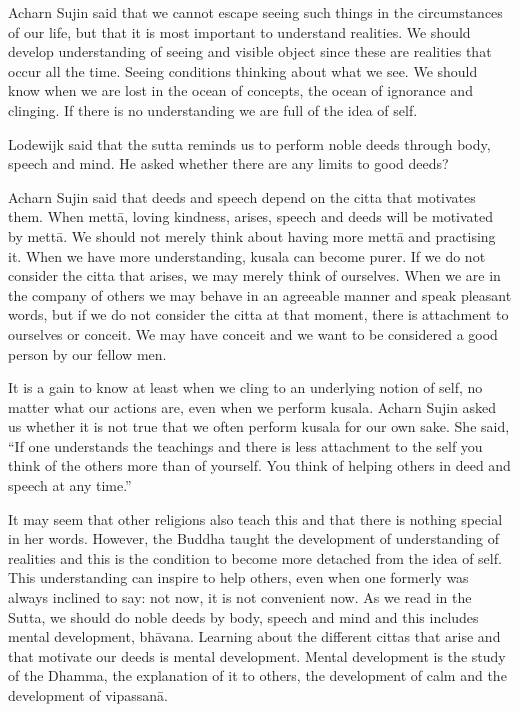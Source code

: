 Acharn Sujin said that we cannot escape seeing such things in the circumstances of our life, but that it is most important to understand realities. We should develop understanding of seeing and visible object since these are realities that occur all the time. Seeing conditions thinking about what we see. We should know when we are lost in the ocean of concepts, the ocean of ignorance and clinging. If there is no understanding we are full of the idea of self.

Lodewijk said that the sutta reminds us to perform noble deeds through body, speech and mind. He asked whether there are any limits to good deeds?

Acharn Sujin said that deeds and speech depend on the citta that motivates them. When mettā, loving kindness, arises, speech and deeds will be motivated by mettā. We should not merely think about having more mettā and practising it. When we have more understanding, kusala can become purer. If we do not consider the citta that arises, we may merely think of ourselves. When we are in the company of others we may behave in an agreeable manner and speak pleasant words, but if we do not consider the citta at that moment, there is attachment to ourselves or conceit. We may have conceit and we want to be considered a good person by our fellow men.

It is a gain to know at least when we cling to an underlying notion of self, no matter what our actions are, even when we perform kusala. Acharn Sujin asked us whether it is not true that we often perform kusala for our own sake. She said, ``If one understands the teachings and there is less attachment to the self you think of the others more than of yourself. You think of helping others in deed and speech at any time.''

It may seem that other religions also teach this and that there is nothing special in her words. However, the Buddha taught the development of understanding of realities and this is the condition to become more detached from the idea of self. This understanding can inspire to help others, even when one formerly was always inclined to say: not now, it is not convenient now. As we read in the Sutta, we should do noble deeds by body, speech and mind and this includes mental development, bhāvana. Learning about the different cittas that arise and that motivate our deeds is mental development. Mental development is the study of the Dhamma, the explanation of it to others, the development of calm and the development of vipassanā.


